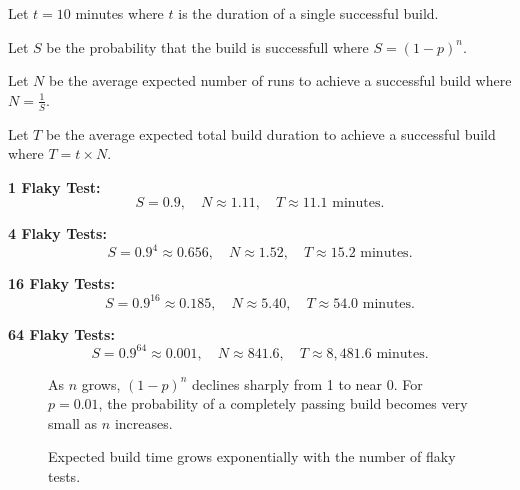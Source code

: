 \documentclass[letterpaper]{article}
\begin{document}
 Let \( t = 10 \) minutes where \(t\) is the duration of a single successful build.

 Let \(S\) be the probability that the build is successfull where \(S = (1 - p)^n\).

 Let \(N\) be the average expected number of runs to achieve a successful build where \(N = \frac{1}{S}\).

 Let \(T\) be the average expected total build duration to achieve a successful build where \(T = t \times N\).


\textbf{1 Flaky Test:}
\[
S = 0.9, \quad N \approx 1.11, \quad T \approx 11.1 \text{ minutes}.
\]

\textbf{4 Flaky Tests:}
\[
S = 0.9^{4} \approx 0.656, \quad N \approx 1.52, \quad T \approx 15.2 \text{ minutes}.
\]

\textbf{16 Flaky Tests:}
\[
S = 0.9^{16} \approx 0.185, \quad N \approx 5.40, \quad T \approx 54.0 \text{ minutes}.
\]

\textbf{64 Flaky Tests:}
\[
S = 0.9^{64} \approx 0.001, \quad N \approx 841.6, \quad T \approx 8,481.6 \text{ minutes}.
\]

\pagebreak

\begin{figure}[h!]
    \centering
    \caption{As $n$ grows, $(1-p)^n$ declines sharply from 1 to near 0. For $p=0.01$, the probability of a completely passing build becomes very small as $n$ increases.}
\end{figure}

\begin{figure}[h!]
    \centering
    \caption{Expected build time grows exponentially with the number of flaky tests.}
\end{figure}
\end{document}
